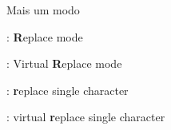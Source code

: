 \begin{frame}{Mais um modo}
    \begin{widedescription}
        \item {}: \textbf{R}eplace mode
        \item {}: Virtual \textbf{R}eplace mode
        \item {}: \textbf{r}eplace single character
        \item {}: virtual \textbf{r}eplace single character
    \end{widedescription}
\end{frame}
